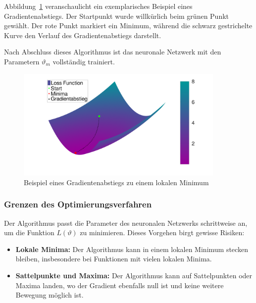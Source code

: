Abbildung~\ref{fig:gradientenabstieg_beispiel} veranschaulicht ein exemplarisches Beispiel eines Gradientenabstiegs.
Der Startpunkt wurde willkürlich beim grünen Punkt gewählt.
Der rote Punkt markiert ein Minimum, während die schwarz gestrichelte Kurve den Verlauf des Gradientenabstiegs darstellt.

Nach Abschluss dieses Algorithmus ist das neuronale Netzwerk mit den Parametern \( \vartheta_m \) vollständig trainiert.

\begin{figure}
    \centering
    \hspace*{-0.1\textwidth}
    \includegraphics[width=0.9\textwidth]{papers/neuronal/images/gd_close_to_minima_long_distances_with_line.png}
    \caption{Beispiel eines Gradientenabstiegs zu einem lokalen Minimum}
    \label{fig:gradientenabstieg_beispiel}
\end{figure}


\subsubsection{Grenzen des Optimierungsverfahren}\label{neuronal:subsubsection:optimierungsverfahren_grenzen}

Der Algorithmus passt die Parameter des neuronalen Netzwerks schrittweise an, um die Funktion \( L(\vartheta) \) zu minimieren. 
Dieses Vorgehen birgt gewisse Risiken:
\begin{itemize}
    \item \textbf{Lokale Minima:} Der Algorithmus kann in einem lokalen Minimum stecken bleiben, insbesondere bei Funktionen mit vielen lokalen Minima.
    \item \textbf{Sattelpunkte und Maxima:} Der Algorithmus kann auf Sattelpunkten oder Maxima landen, wo der Gradient ebenfalls null ist und keine weitere Bewegung möglich ist.
\end{itemize}


